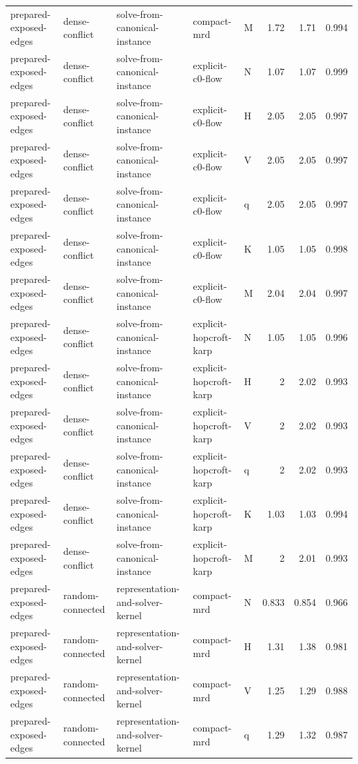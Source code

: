\begin{table}[t]
\begin{tabular}{lllllrrr}
prepared-exposed-edges & dense-conflict & solve-from-canonical-instance & compact-mrd & M & 1.72 & 1.71 & 0.994 \\
prepared-exposed-edges & dense-conflict & solve-from-canonical-instance & explicit-c0-flow & N & 1.07 & 1.07 & 0.999 \\
prepared-exposed-edges & dense-conflict & solve-from-canonical-instance & explicit-c0-flow & H & 2.05 & 2.05 & 0.997 \\
prepared-exposed-edges & dense-conflict & solve-from-canonical-instance & explicit-c0-flow & V & 2.05 & 2.05 & 0.997 \\
prepared-exposed-edges & dense-conflict & solve-from-canonical-instance & explicit-c0-flow & q & 2.05 & 2.05 & 0.997 \\
prepared-exposed-edges & dense-conflict & solve-from-canonical-instance & explicit-c0-flow & K & 1.05 & 1.05 & 0.998 \\
prepared-exposed-edges & dense-conflict & solve-from-canonical-instance & explicit-c0-flow & M & 2.04 & 2.04 & 0.997 \\
prepared-exposed-edges & dense-conflict & solve-from-canonical-instance & explicit-hopcroft-karp & N & 1.05 & 1.05 & 0.996 \\
prepared-exposed-edges & dense-conflict & solve-from-canonical-instance & explicit-hopcroft-karp & H & 2 & 2.02 & 0.993 \\
prepared-exposed-edges & dense-conflict & solve-from-canonical-instance & explicit-hopcroft-karp & V & 2 & 2.02 & 0.993 \\
prepared-exposed-edges & dense-conflict & solve-from-canonical-instance & explicit-hopcroft-karp & q & 2 & 2.02 & 0.993 \\
prepared-exposed-edges & dense-conflict & solve-from-canonical-instance & explicit-hopcroft-karp & K & 1.03 & 1.03 & 0.994 \\
prepared-exposed-edges & dense-conflict & solve-from-canonical-instance & explicit-hopcroft-karp & M & 2 & 2.01 & 0.993 \\
prepared-exposed-edges & random-connected & representation-and-solver-kernel & compact-mrd & N & 0.833 & 0.854 & 0.966 \\
prepared-exposed-edges & random-connected & representation-and-solver-kernel & compact-mrd & H & 1.31 & 1.38 & 0.981 \\
prepared-exposed-edges & random-connected & representation-and-solver-kernel & compact-mrd & V & 1.25 & 1.29 & 0.988 \\
prepared-exposed-edges & random-connected & representation-and-solver-kernel & compact-mrd & q & 1.29 & 1.32 & 0.987 \\

\end{tabular}
\end{table}

